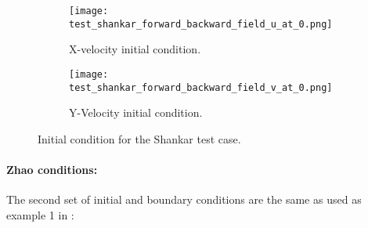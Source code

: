 \begin{figure}
\centering
\begin{subfigure}{.5\textwidth}
  \centering
  \texttt{[image: test\_shankar\_forward\_backward\_field\_u\_at\_0.png]}
  \caption{X-velocity initial condition.}
  \label{fig:shankar_ic1}
\end{subfigure}%
\begin{subfigure}{.5\textwidth}
  \centering
  \texttt{[image: test\_shankar\_forward\_backward\_field\_v\_at\_0.png]}
  \caption{Y-Velocity initial condition.}
  \label{fig:shankar_ic2}
\end{subfigure}
\caption{Initial condition for the Shankar test case.}
\label{fig:shankar_ic}
\end{figure}


\paragraph{Zhao conditions:}

The second set of initial and boundary conditions are the same as used as example 1 in \citet{zhao2011new}:

